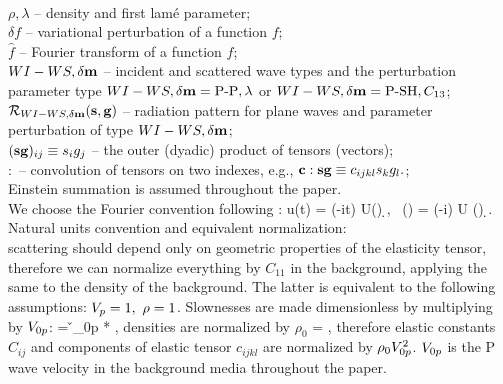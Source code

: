 \\
$\rho, \lambda$ -- density and first lamé parameter;
\\
$\delta f$ -- variational perturbation of a function $f$;
\\
$\hat{f}$ -- Fourier transform of a function $f$;
\\
${WI-WS, \delta \mathbf{m}}$ -- incident and scattered wave types and the perturbation parameter type  ${WI-WS, \delta \mathbf{m}} = \text{P-P}, \lambda$ or ${WI-WS, \delta \mathbf{m}} = \text{P-SH}, C_{13}$;
\\
$\mathcal{R}_{WI-WS, \delta \mathbf{m}}(\mathbf{s},\mathbf{g})$ -- radiation pattern for plane waves and parameter perturbation of type ${WI-WS, \delta \mathbf{m}}$;
\\
$(\mathbf{s}  \mathbf{g})_{ij} \equiv s_i g_j$ -- the outer (dyadic) product of tensors (vectors); 
\\
$:$ -- convolution of tensors on two indexes, e.g.,
$\mathbf{c}:\mathbf{s}\mathbf{g} \equiv c_{ijkl}s_kg_l.$;
\\
Einstein summation is assumed throughout the paper.
\\
We choose the Fourier convention following \cite{hudson1981}:
\beq 
u(t) = \inty \exp(-i\omega t) U(\omega) \d \omega,~ (\Kv) = \intyV \exp(-i\Kv\xv) U (\xv) \d \xv.
\eeq
Natural units convention and equivalent normalization: 
\\ 
scattering should depend only on geometric properties of the elasticity tensor, therefore we can normalize everything by $C_{11}$ in the background, applying the same to the density of the background. The latter is equivalent to the following assumptions:
$V_p = 1, ~ \rho = 1$.
Slownesses are made dimensionless by multiplying by $V_{0p}$:
\beq
\svn = \v_{0p} * \sv,
\eeq
densities are normalized by $\rho_0$
\beq
\nmz{\rho} = ,
\eeq
therefore elastic constants $C_{ij}$ and components of elastic tensor $c_{ijkl}$ are normalized by $\rho_0 V^2_{0p}$.
$V_{0p}$ is the P wave velocity in the background media throughout the paper.


 






